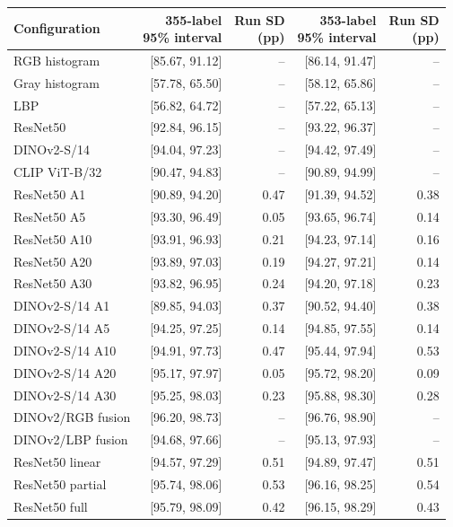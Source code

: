 \begin{tabular}{lrrrr}
\toprule
Configuration & \makecell{355-label\\95\% interval} & \makecell{Run SD\\(pp)} & \makecell{353-label\\95\% interval} & \makecell{Run SD\\(pp)} \\
\midrule
RGB histogram & [85.67, 91.12] & -- & [86.14, 91.47] & -- \\
Gray histogram & [57.78, 65.50] & -- & [58.12, 65.86] & -- \\
LBP & [56.82, 64.72] & -- & [57.22, 65.13] & -- \\
ResNet50 & [92.84, 96.15] & -- & [93.22, 96.37] & -- \\
DINOv2-S/14 & [94.04, 97.23] & -- & [94.42, 97.49] & -- \\
CLIP ViT-B/32 & [90.47, 94.83] & -- & [90.89, 94.99] & -- \\
ResNet50 A1 & [90.89, 94.20] & 0.47 & [91.39, 94.52] & 0.38 \\
ResNet50 A5 & [93.30, 96.49] & 0.05 & [93.65, 96.74] & 0.14 \\
ResNet50 A10 & [93.91, 96.93] & 0.21 & [94.23, 97.14] & 0.16 \\
ResNet50 A20 & [93.89, 97.03] & 0.19 & [94.27, 97.21] & 0.14 \\
ResNet50 A30 & [93.82, 96.95] & 0.24 & [94.20, 97.18] & 0.23 \\
DINOv2-S/14 A1 & [89.85, 94.03] & 0.37 & [90.52, 94.40] & 0.38 \\
DINOv2-S/14 A5 & [94.25, 97.25] & 0.14 & [94.85, 97.55] & 0.14 \\
DINOv2-S/14 A10 & [94.91, 97.73] & 0.47 & [95.44, 97.94] & 0.53 \\
DINOv2-S/14 A20 & [95.17, 97.97] & 0.05 & [95.72, 98.20] & 0.09 \\
DINOv2-S/14 A30 & [95.25, 98.03] & 0.23 & [95.88, 98.30] & 0.28 \\
DINOv2/RGB fusion & [96.20, 98.73] & -- & [96.76, 98.90] & -- \\
DINOv2/LBP fusion & [94.68, 97.66] & -- & [95.13, 97.93] & -- \\
ResNet50 linear & [94.57, 97.29] & 0.51 & [94.89, 97.47] & 0.51 \\
ResNet50 partial & [95.74, 98.06] & 0.53 & [96.16, 98.25] & 0.54 \\
ResNet50 full & [95.79, 98.09] & 0.42 & [96.15, 98.29] & 0.43 \\
\bottomrule
\end{tabular}
